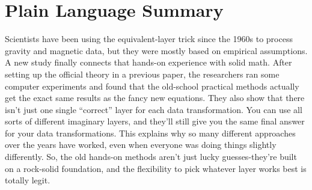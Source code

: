\documentclass[draft]{agujournal2019}
\begin{document}




\section*{Plain Language Summary}
Scientists have been using the equivalent-layer trick since the 1960s to process 
gravity and magnetic data, but they were mostly based on empirical assumptions. 
A new study finally connects that hands-on experience with solid math. After setting up 
the official theory in a previous paper, the researchers ran some computer experiments 
and found that the old-school practical methods actually get the exact same results as 
the fancy new equations. They also show that there isn't just one single ``correct'' layer 
for each data transformation. You can use all sorts of different imaginary layers, and 
they'll still give you the same final answer for your data transformations. This explains 
why so many different approaches over the years have worked, even when everyone was doing 
things slightly differently. So, the old hands-on methods aren't just lucky 
guesses-they're built on a rock-solid foundation, and the flexibility to pick whatever 
layer works best is totally legit.


%
%

%

\end{document}
